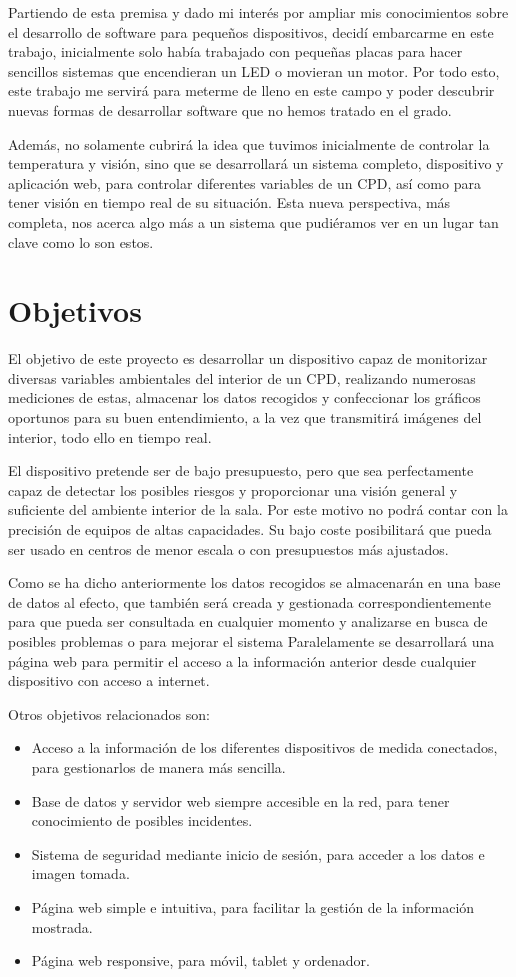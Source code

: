 Partiendo de esta premisa y dado mi interés por ampliar mis conocimientos sobre el desarrollo de software para pequeños dispositivos, decidí embarcarme en este trabajo, inicialmente solo había trabajado con pequeñas placas para hacer sencillos sistemas que encendieran un LED o movieran un motor. Por todo esto, este trabajo me servirá para meterme de lleno en este campo y poder descubrir nuevas formas de desarrollar software que no hemos tratado en el grado.

Además, no solamente cubrirá la idea que tuvimos inicialmente de controlar la temperatura y visión, sino que se desarrollará un sistema completo, dispositivo y aplicación web, para controlar diferentes variables de un CPD, así como para tener visión en tiempo real de su situación. Esta nueva perspectiva, más completa, nos acerca algo más a un sistema que pudiéramos ver en un lugar tan clave como lo son estos.

\section{Objetivos}
El objetivo de este proyecto es desarrollar un dispositivo capaz de monitorizar diversas variables ambientales del interior de un CPD, realizando numerosas mediciones de estas, almacenar los datos recogidos y confeccionar los gráficos oportunos para su buen entendimiento, a la vez que transmitirá imágenes del interior, todo ello en tiempo real.

El dispositivo pretende ser de bajo presupuesto, pero que sea perfectamente capaz de detectar los posibles riesgos y proporcionar una visión general y suficiente del ambiente interior de la sala. Por este motivo no podrá contar con la precisión de equipos de altas capacidades. Su bajo coste posibilitará que pueda ser usado en centros de menor escala o con presupuestos más ajustados.

Como se ha dicho anteriormente los datos recogidos se almacenarán en una base de datos al efecto, que también será creada y gestionada correspondientemente para que pueda ser consultada  en cualquier momento y analizarse en busca de posibles problemas o para mejorar el sistema Paralelamente se desarrollará una página web para permitir el acceso a la información anterior desde cualquier dispositivo con acceso a internet.

Otros objetivos relacionados son:
\begin{itemize}
	\item Acceso a la información de los diferentes dispositivos de medida conectados, para gestionarlos de manera más sencilla.
	      \pagebreak
	      
	\item Base de datos y servidor web siempre accesible en la red, para tener conocimiento de posibles incidentes.
	\item Sistema de seguridad mediante inicio de sesión, para acceder a los datos e imagen tomada.
	\item Página web simple e intuitiva, para facilitar la gestión de la información mostrada.
	\item Página web responsive, para móvil, tablet y ordenador.
\end{itemize}

